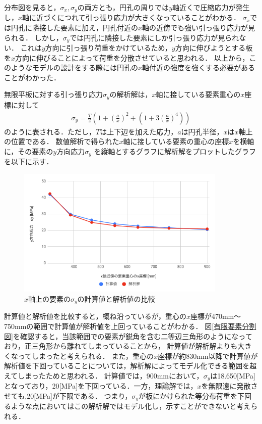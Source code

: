 \documentclass[a4paper,11pt,uplatex]{jsarticle}
\begin{document}
分布図を見ると，$\sigma_x,\sigma_y$の両方とも，円孔の周りでは$y$軸近くで圧縮応力が発生し，$x$軸に近づくにつれて引っ張り応力が大きくなっていることがわかる．
$\sigma_x$では円孔に隣接した要素に加え，円孔付近の$x$軸の近傍でも強い引っ張り応力が見られる．
しかし，$\sigma_y$では円孔に隣接した要素にしか引っ張り応力が見られない．
これは$y$方向に引っ張り荷重をかけているため，$y$方向に伸びようとする板を$x$方向に伸びることによって荷重を分散させていると思われる．
以上から，このようなモデルの設計をする際には円孔の$x$軸付近の強度を強くする必要があることがわかった．

\par
無限平板に対する引っ張り応力$\sigma_y$の解析解は，$x$軸に接している要素重心の$x$座標に対して
\begin{align}
  \sigma_y = \frac{T}{2} \left(1+ \left(\frac{a}{x}\right)^2 + \left(1 + 3\left(\frac{a}{x}\right)^4\right)\right)
\end{align}
のように表される．ただし，$T$は上下辺を加えた応力，$a$は円孔半径，$x$は$x$軸上の位置である．
数値解析で得られた$x$軸に接している要素の重心の座標$x$を横軸に，その要素の$y$方向応力$\sigma_y$
を縦軸とするグラフに解析解をプロットしたグラフを以下に示す．
\begin{figure}[H]
  \begin{center}
    \includegraphics[width = 10cm]{画像/グラフ.png}
    \caption{$x$軸上の要素の$\sigma_y$の計算値と解析値の比較}
    \label{比較}
  \end{center}
\end{figure}

計算値と解析値を比較すると，概ね沿っているが，重心の$x$座標が470mm〜750mmの範囲で計算値が解析値を上回っていることがわかる．
図\ref{有限要素分割図}を確認すると，当該範囲での要素が鋭角を含む二等辺三角形のようになっており，正三角形から離れてしまっていることから，
計算値が解析解よりも大きくなってしまったと考えられる．
また，重心の$x$座標が約830mm以降で計算値が解析値を下回っていることについては，解析解によってモデル化できる範囲を超えてしまったためと思われる．
計算値では，900mmにおいて，$\sigma_y$は18.650[MPa]となっており，20[MPa]を下回っている．一方，理論解では，$x$を無限遠に発散させても,20[MPa]が下限である．
つまり，$\sigma_y$が板にかけられた等分布荷重を下回るような点においてはこの解析解ではモデル化し，示すことができないと考えられる．
\end{document}

